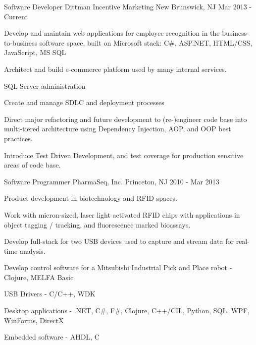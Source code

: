 \documentclass[11pt, letterpaper]{awesome-cv}
\begin{document}


\begin{cventries}
  \cventry
    {Software Developer} %
    {Dittman Incentive Marketing} %
    {New Brunswick, NJ} %
    {Mar 2013 - Current} 
    {
      \begin{cvitems} 
        \item {Develop and maintain web applications for employee recognition in the business-to-business software space, built on Microsoft stack: C\#, ASP.NET, HTML/CSS, JavaScript, MS SQL}
        \item {Architect and build e-commerce platform used by many internal services.}
        \item {SQL Server administration}
        \item {Create and manage SDLC and deployment processes}
        \item {Direct major refactoring and future development to (re-)engineer code base into multi-tiered architecture using Dependency Injection, AOP, and OOP best practices.}
	\item {Introduce Test Driven Development, and test coverage for production sensitive areas of code base.}
      \end{cvitems}
    }

  \cventry
    {Software Programmer} %
    {PharmaSeq, Inc.} %
    {Princeton, NJ} %
    {2010 - Mar 2013} %
    {
      \begin{cvitems} 
        \item {Product development in biotechnology and RFID spaces.}
        \item {Work with micron-sized, laser light activated RFID chips with applications in object tagging / tracking, and fluorescence marked bioassays.}
        \item {Develop full-stack for two USB devices used to capture and stream data for real-time analysis.}
        \item {Develop control software for a Mitsubishi Industrial Pick and Place robot - Clojure, MELFA Basic}
        \item {USB Drivers - C/C++, WDK}
        \item {Desktop applications - .NET, C\#, F\#, Clojure, C++/CIL, Python, SQL, WPF, WinForms, DirectX}
        \item {Embedded software - AHDL, C}
      \end{cvitems}
    }


\end{cventries}
\end{document}

